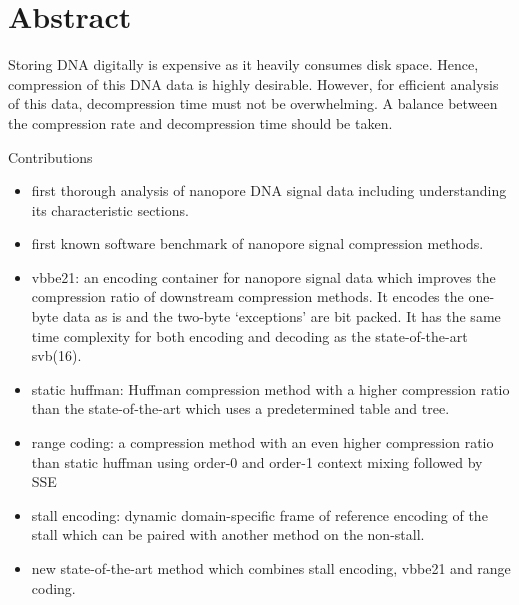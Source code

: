 \chapter*{Abstract}

Storing DNA digitally is expensive as it heavily consumes disk space. Hence,
compression of this DNA data is highly desirable. However, for efficient
analysis of this data, decompression time must not be overwhelming. A balance
between the compression rate and decompression time should be taken.

Contributions
\begin{itemize}
\item first thorough analysis of nanopore DNA signal data including
	understanding its characteristic sections.
\item first known software benchmark of nanopore signal compression methods.
\item vbbe21: an encoding container for nanopore signal data which improves the
	compression ratio of downstream compression methods.
It encodes the one-byte data as is and the two-byte `exceptions' are bit packed.
It has the same time complexity for both encoding and decoding as the
state-of-the-art svb(16).
\item static huffman: Huffman compression method with a higher compression ratio than
	the state-of-the-art which uses a predetermined table and tree.
\item range coding: a compression method with an even higher compression ratio
	than static huffman using order-0 and order-1 context mixing followed by
	SSE
\item stall encoding: dynamic domain-specific frame of reference encoding of the
	stall which can be paired with another method on the non-stall.
\item new state-of-the-art method which combines stall encoding, vbbe21 and
	range coding.
\end{itemize}
